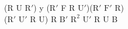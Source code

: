 (R U $\text{R}'$) y ($\text{R}'$ F R $\text{U}'$)($\text{R}'$ $\text{F}'$ R)\\
($\text{R}'$ $\text{U}'$ R U) R $\text{B}'$ $\text{R}^2$ $\text{U}'$ R U B\\
